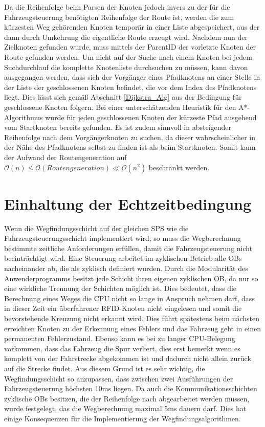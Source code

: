 			Da die Reihenfolge beim Parsen der Knoten jedoch invers zu der für die Fahrzeugsteuerung benötigten Reihenfolge der Route ist, werden die zum kürzesten Weg gehörenden Knoten temporär in einer Liste abgespeichert, aus der dann durch Umkehrung die eigentliche Route erzeugt wird. Nachdem nun der Zielknoten gefunden wurde, muss mittels der ParentID der vorletzte Knoten der Route gefunden werden. Um nicht auf der Suche nach einem Knoten bei jedem Suchdurchlauf die komplette Knotenliste durchsuchen zu müssen, kann davon ausgegangen werden, dass sich der Vorgänger eines Pfadknotens an einer Stelle in der Liste der geschlossenen Knoten befindet, die vor dem  Index des Pfadknotens liegt. Dies lässt sich gemäß Abschnitt \ref{Dijkstra_Alg} aus der Bedingung für geschlossene Knoten folgern. Bei einer unterschätzenden Heuristik für den A*-Algorithmus wurde für jeden geschlossenen Knoten der kürzeste Pfad ausgehend vom Startknoten bereits gefunden. Es ist zudem sinnvoll in absteigender Reihenfolge nach dem Vorgängerknoten zu suchen, da dieser wahrscheinlicher in der Nähe des Pfadknotens selbst zu finden ist als beim Startknoten. Somit kann der Aufwand der Routengeneration auf $\mathcal{O}(n)\le \mathcal{O}(Routengeneration)\ll \mathcal{O}(n^2)$ beschränkt werden.
			
			
	\section{Einhaltung der Echtzeitbedingung}
		\label{Echtzeitbedingung}
		Wenn die Wegfindungsschicht auf der gleichen \ac{SPS} wie die Fahrzeugsteuerungsschicht implementiert wird, so muss die Wegberechnung bestimmte zeitliche Anforderungen erfüllen, damit die Fahrzeugsteuerung nicht beeinträchtigt wird. Eine Steuerung arbeitet im zyklischen Betrieb alle \ac{OB}s nacheinander ab, die als zyklisch definiert wurden. Durch die Modularität des Anwenderprogramms besitzt jede Schicht ihren eigenen zyklischen \ac{OB}, da nur so eine wirkliche Trennung der Schichten möglich ist. Dies bedeutet, dass die Berechnung eines Weges die CPU nicht so lange in Anspruch nehmen darf, dass in dieser Zeit  ein überfahrener RFID-Knoten nicht eingelesen und somit die bevorstehende Kreuzung nicht erkannt wird. Dies führt spätestens beim nächsten erreichten Knoten zu der Erkennung eines Fehlers und das Fahrzeug geht in einen permanenten Fehlerzustand. Ebenso kann es bei zu langer CPU-Belegung vorkommen, dass das Fahrzeug die Spur verliert, dies erst bemerkt wenn es komplett von der Fahrstrecke abgekommen ist und dadurch nicht allein zurück auf die Strecke findet. Aus diesem Grund ist es sehr wichtig, die Wegfindungsschicht so anzupassen, dass zwischen zwei Ausführungen der Fahrzeugsteuerung höchsten 10ms liegen. Da auch die Kommunikationsschichten zyklische \ac{OB}s besitzen, die der Reihenfolge nach abgearbeitet werden müssen, wurde festgelegt, das die Wegberechnung maximal 5ms dauern darf. Dies hat einige Konsequenzen für die Implementierung der Wegfindungsalgorithmen.
		
